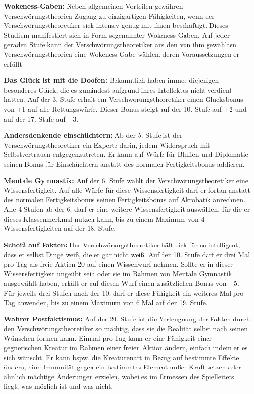 \documentclass[
	ngerman,
	a4paper,
	11pt,
	twocolumn,
]{scrartcl}
\begin{document}
\textbf{Wokeness-Gaben:} Neben allgemeinen Vorteilen gewähren Verschwörungstheorien Zugang zu einzigartigen Fähigkeiten, wenn der Verschwörungstheoretiker sich intensiv genug mit ihnen beschäftigt. Dieses Studium manifestiert sich in Form sogenannter Wokeness-Gaben. Auf jeder geraden Stufe kann der Verschwörungstheoretiker aus den von ihm gewählten Verschwörungstheorien eine Wokeness-Gabe wählen, deren Voraussetzungen er erfüllt.

\textbf{Das Glück ist mit die Doofen:} Bekanntlich haben immer diejenigen besonderes Glück, die es zumindest aufgrund ihres Intellektes nicht verdient hätten. Auf der 3. Stufe erhält ein Verschwörungstheoretiker einen Glücksbonus von +1 auf alle Rettungswürfe. Dieser Bonus steigt auf der 10. Stufe auf +2 und auf der 17. Stufe auf +3.

\textbf{Andersdenkende einschüchtern:} Ab der 5. Stufe ist der Verschwörungstheoretiker ein Experte darin, jedem Widerspruch mit Selbstvertrauen entgegenzutreten. Er kann auf Würfe für Bluffen und Diplomatie seinen Bonus für Einschüchtern anstatt des normalen Fertigkeitsbonus addieren.

\textbf{Mentale Gymnastik:} Auf der 6. Stufe wählt der Verschwörungstheoretiker eine Wissensfertigkeit. Auf alle Würfe für diese Wissensfertigkeit darf er fortan anstatt des normalen Fertigkeitsbonus seinen Fertigkeitsbonus auf Akrobatik anrechnen. Alle 4 Stufen ab der 6. darf er eine weitere Wissensfertigkeit auswählen, für die er dieses Klassenmerkmal nutzen kann, bis zu einem Maximum von 4 Wissensfertigkeiten auf der 18. Stufe.

\textbf{Scheiß auf Fakten:} Der Verschwörungstheoretiker hält sich für so intelligent, dass er selbst Dinge weiß, die er gar nicht weiß. Auf der 10. Stufe darf er drei Mal pro Tag als freie Aktion 20 auf einen Wissenwurf nehmen. Sollte er in dieser Wissensfertigkeit ungeübt sein oder sie im Rahmen von Mentale Gymnastik ausgewählt haben, erhält er auf diesen Wurf einen zusätzlichen Bonus von +5. Für jeweils drei Stufen nach der 10. darf er diese Fähigkeit ein weiteres Mal pro Tag anwenden, bis zu einem Maximum von 6 Mal auf der 19. Stufe.

\textbf{Wahrer Postfaktismus:} Auf der 20. Stufe ist die Verleugnung der Fakten durch den Verschwörungstheoretiker so mächtig, dass sie die Realität selbst nach seinen Wünschen formen kann. Einmal pro Tag kann er eine Fähigkeit einer gegnerischen Kreatur im Rahmen einer freien Aktion ändern, einfach indem er es sich wünscht. Er kann bspw. die Kreaturenart in Bezug auf bestimmte Effekte ändern, eine Immunität gegen ein bestimmtes Element außer Kraft setzen oder ähnlich mächtige Änderungen erzielen, wobei es im Ermessen des Spielleiters liegt, was möglich ist und was nicht.
\end{document}
